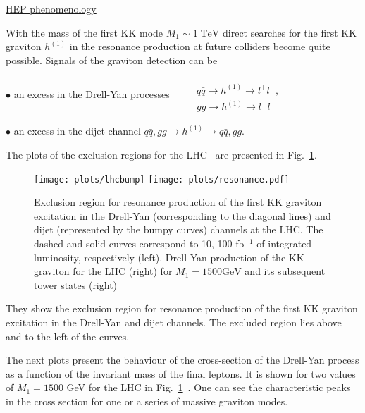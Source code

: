 \documentclass{cernyrep}
\begin{document}
\underline{HEP phenomenology}

With the mass of the first KK mode $M_{1} \sim 1 \; \mbox{TeV}$
direct searches for the first KK graviton $h^{(1)}$ in the
resonance production at future colliders become quite possible.
Signals of the graviton detection can be~\cite{DHR}\vspace{-0.5cm}

$\bullet$ an excess in the Drell-Yan processes \ \ \ \
$\begin{array}{l}  \\ q \bar{q}\rightarrow h^{(1)} \rightarrow
l^{+}l^{-},\\
gg \rightarrow h^{(1)} \rightarrow l^{+}l^{-}
\end{array}$

 $\bullet$ an excess in the dijet channel \hspace{1.5cm}  $
q \bar{q}, gg \rightarrow h^{(1)} \rightarrow q \bar{q},
gg.$\vspace{0.3cm}

\noindent The plots of the exclusion regions for the LHC~\cite{DHR} are presented in Fig.~\ref{RS-DY}.\\

\begin{figure}[htb]
\begin{center}
\leavevmode
\texttt{[image: plots/lhcbump]}
\texttt{[image: plots/resonance.pdf]}
\end{center}
\caption{Exclusion region for resonance production of the first KK
graviton excitation in the Drell-Yan (corresponding to the
diagonal lines) and dijet (represented by the bumpy curves)
channels at the 
LHC. The dashed and solid
curves correspond to 10, 100  fb$^{-1}$ of integrated luminosity,
respectively (left). Drell-Yan production of the KK graviton  for the LHC (right) for $M_1 = 1500 \text{GeV}$ and its subsequent tower states (right)
} \label{RS-DY}
\end{figure}


 They show the exclusion region for resonance
production of the first KK graviton excitation in the Drell-Yan
and dijet channels. The excluded region lies above and to the left
of the curves.

The next plots present the behaviour of the cross-section of the
Drell-Yan process as a function of the invariant mass of the final
leptons. It is shown for two values of $M_{1}=1500$  GeV for the LHC in  Fig.~\ref{RS-DY}~\cite{DHR}. One can see the
characteristic peaks in the cross section for one or a series of
massive graviton modes.
\end{document}

